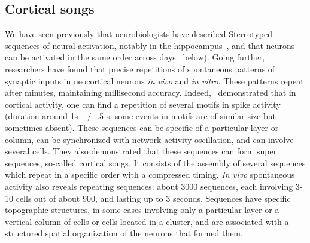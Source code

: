 \documentclass[brainsci, %
               review,submit,pdftex,moreauthors
               ]{Definitions/mdpi}
\begin{document}
\subsection{Cortical songs}
We have seen previously that neurobiologists have described Stereotyped sequences of neural activation, notably in the hippocampus~\citep{pastalkova_internally_2008,villette_internally_2015,malvache_awake_2016}, and that neurons can be activated in the same order across days~\citep{haimerl_internal_2019} below). 
Going further, researchers have found that  precise repetitions of spontaneous patterns of synaptic inputs in neocortical neurons \textit{in vivo} and \textit{in vitro}. These patterns repeat after minutes, maintaining millisecond accuracy. Indeed,~\citet{ikegaya_synfire_2004} demonstrated that in cortical activity, one can find a repetition of several motifs in spike activity (duration around 1s +/- .5 s, some events in motifs are of similar size but sometimes absent). These sequences can be specific of a particular layer or column, can be synchronized with network activity oscillation, and can involve several cells. They also demonstrated that these sequences can form super sequences, so-called cortical songs. It consists of the assembly of several sequences which repeat in a specific order with a compressed timing. \emph{In vivo} spontaneous activity also reveals repeating sequences: about 3000 sequences, each involving 3-10 cells out of about 900, and lasting up to 3 seconds. Sequences have specific topographic structures, in some cases involving only a particular layer or a vertical column of cells or cells located in a cluster, and are associated with a structured spatial organization of the neurons that formed them. %
\end{document}
